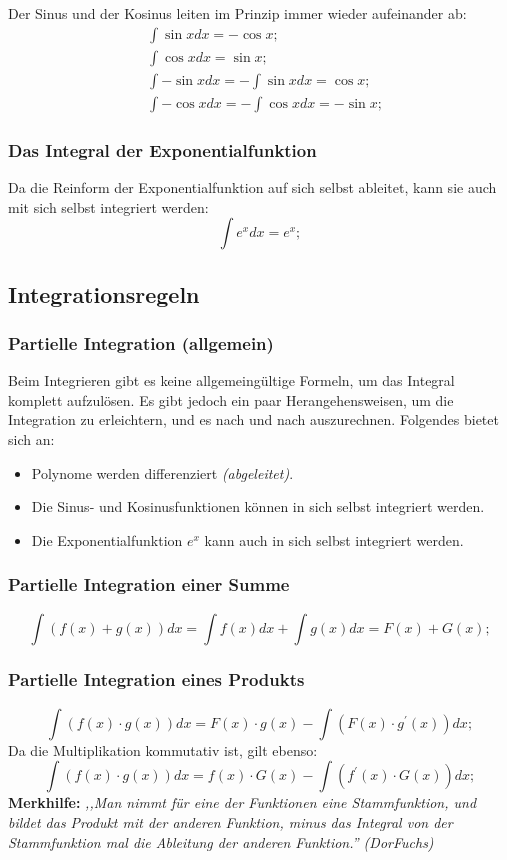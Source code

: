 \documentclass[a4paper]{article}
\begin{document}
Der Sinus und der Kosinus leiten im Prinzip immer wieder aufeinander ab:
\begin{align*}
	& \int \sin{x} dx = -\cos{x} ;
	\\
	& \int \cos{x} dx = \sin{x} ;
	\\
	& \int -\sin{x} dx = - \int \sin{x} dx = \cos{x} ;
	\\
	& \int -\cos{x} dx = - \int \cos{x} dx = -\sin{x} ;
\end{align*}

\subsubsection{Das Integral der Exponentialfunktion}
Da die Reinform der Exponentialfunktion auf sich selbst ableitet, kann sie auch mit sich selbst integriert werden:
\[
	\int e^x dx = e^x ;
\]

\subsection{Integrationsregeln}

\subsubsection{Partielle Integration (allgemein)}
Beim Integrieren gibt es keine allgemeing\"ultige Formeln, um das Integral komplett
aufzul\"osen. Es gibt jedoch ein paar Herangehensweisen, um die Integration zu erleichtern, und es nach und nach auszurechnen. Folgendes bietet sich an:
\begin{itemize}[nosep]
	\item Polynome werden differenziert \textit{(abgeleitet)}.
	\item Die Sinus- und Kosinusfunktionen k\"onnen in sich selbst integriert werden.
	\item Die Exponentialfunktion $ e^x $ kann auch in sich selbst integriert werden.
\end{itemize}

\subsubsection{Partielle Integration einer Summe}
\[
	\int \left( f(x) + g(x) \right) dx = \int f(x) dx + \int g(x) dx = F(x) + G(x) ;
\]

\subsubsection{Partielle Integration eines Produkts}
\[
	\int \left( f(x) \cdot g(x) \right) dx = F(x) \cdot g(x) - \int \left( F(x) \cdot g^\prime(x) \right) dx ;
\]
Da die Multiplikation kommutativ ist, gilt ebenso:
\[
	\int \left( f(x) \cdot g(x) \right) dx = f(x) \cdot G(x) - \int \left( f^\prime(x) \cdot G(x) \right) dx ;
\]
\textbf{Merkhilfe:} \textit{,,Man nimmt f\"ur eine der Funktionen eine Stammfunktion, und bildet das Produkt mit der anderen Funktion, minus das Integral von der Stammfunktion mal die Ableitung der anderen Funktion.'' (DorFuchs)}
\end{document}

